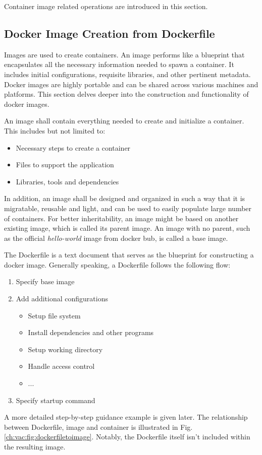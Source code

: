 Container image related operations are introduced in this section.

\subsection{Docker Image Creation from Dockerfile}

Images are used to create containers. An image performs like a blueprint that encapsulates all the necessary information needed to spawn a container. It includes initial configurations, requisite libraries, and other pertinent metadata. Docker images are highly portable and can be shared across various machines and platforms. This section delves deeper into the construction and functionality of docker images.

An image shall contain everything needed to create and initialize a container. This includes but not limited to:
\begin{itemize}
  \item Necessary steps to create a container
  \item Files to support the application
  \item Libraries, tools and dependencies
\end{itemize}
In addition, an image shall be designed and organized in such a way that it is migratable, reusable and light, and can be used to easily populate large number of containers. For better inheritability, an image might be based on another existing image, which is called its parent image. An image with no parent, such as the official \textit{hello-world} image from docker bub, is called a base image.

The Dockerfile is a text document that serves as the blueprint for constructing a docker image. Generally speaking, a Dockerfile follows the following flow:
\begin{enumerate}[(1)]
	\item Specify base image
	\item Add additional configurations
	\begin{itemize}
		\item Setup file system
		\item Install dependencies and other programs
		\item Setup working directory
		\item Handle access control
		\item ...
	\end{itemize}
	\item Specify startup command
\end{enumerate}
A more detailed step-by-step guidance example is given later. The relationship between Dockerfile, image and container is illustrated in Fig. \ref{ch:vac:fig:dockerfiletoimage}. Notably, the Dockerfile itself isn't included within the resulting image.

